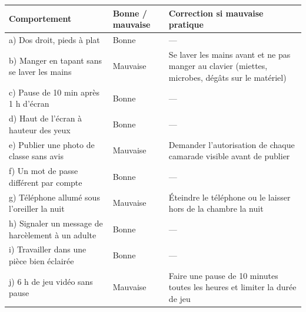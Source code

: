 \documentclass[11pt]{article}
\begin{document}
\begin{corrige}
\begin{center}
\begin{tabularx}{\linewidth}{|X|l|X|}
\hline
\rowcolor{popblueL} \textbf{Comportement} & \textbf{Bonne / mauvaise} & \textbf{Correction si mauvaise pratique} \\
\hline
a) Dos droit, pieds à plat & Bonne & --- \\
\hline
b) Manger en tapant sans se laver les mains & Mauvaise & Se laver les mains avant et ne pas manger au clavier (miettes, microbes, dégâts sur le matériel) \\
\hline
c) Pause de 10 min après 1 h d'écran & Bonne & --- \\
\hline
d) Haut de l'écran à hauteur des yeux & Bonne & --- \\
\hline
e) Publier une photo de classe sans avis & Mauvaise & Demander l'autorisation de chaque camarade visible avant de publier \\
\hline
f) Un mot de passe différent par compte & Bonne & --- \\
\hline
g) Téléphone allumé sous l'oreiller la nuit & Mauvaise & Éteindre le téléphone ou le laisser hors de la chambre la nuit \\
\hline
h) Signaler un message de harcèlement à un adulte & Bonne & --- \\
\hline
i) Travailler dans une pièce bien éclairée & Bonne & --- \\
\hline
j) 6 h de jeu vidéo sans pause & Mauvaise & Faire une pause de 10 minutes toutes les heures et limiter la durée de jeu \\
\hline
\end{tabularx}
\end{center}
\end{corrige}
\end{document}
